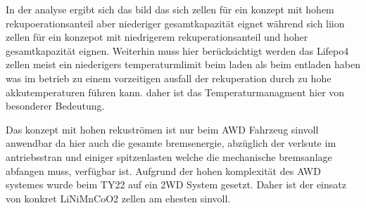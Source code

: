 In der analyse ergibt sich das bild das sich  zellen für ein konzept mit hohem rekupoerationsanteil aber niederiger gesamtkapazität eignet während sich liion zellen für ein konzepot mit niedrigerem rekuperationsanteil und hoher gesamtkapazität eignen. Weiterhin muss hier berücksichtigt werden das Lifepo4 zellen meist ein niederigers temperaturmlimit beim laden als beim entladen haben was im betrieb zu einem vorzeitigen ausfall der rekuperation durch zu hohe akkutemperaturen führen kann. daher ist das Temperaturmanagment hier von besonderer Bedeutung.

Das konzept mit hohen rekuströmen ist nur beim AWD Fahrzeug sinvoll anwendbar da hier auch die gesamte bremsenergie, abzüglich der verlsute im antriebsstran und einiger spitzenlasten welche die mechanische bremsanlage abfangen muss, verfügbar ist. Aufgrund der hohen komplexität des AWD systemes wurde beim TY22 auf ein 2WD System gesetzt. Daher ist der einsatz von konkret LiNiMnCoO2 zellen am ehesten sinvoll.
\FloatBarrier
